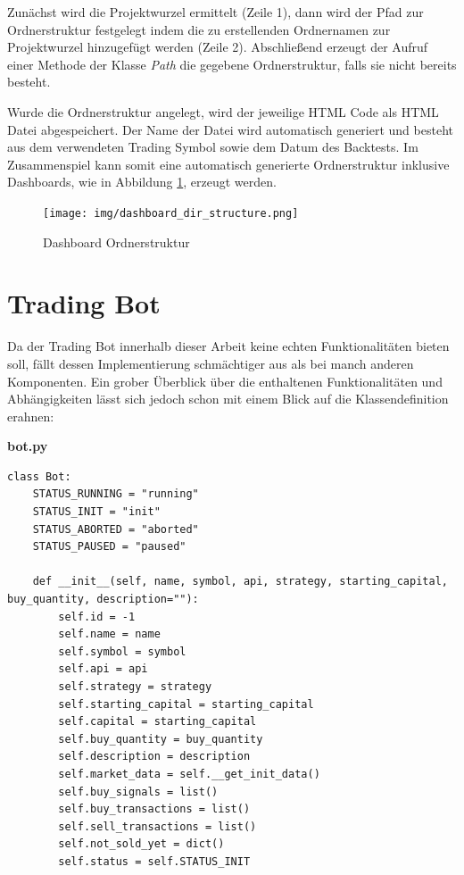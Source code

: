 \documentclass[oneside]{ausarbeitung}
\begin{document}
Zunächst wird die Projektwurzel ermittelt (Zeile 1), dann wird der Pfad zur Ordnerstruktur festgelegt indem die zu erstellenden Ordnernamen zur Projektwurzel  hinzugefügt werden (Zeile 2). Abschließend erzeugt der Aufruf einer Methode der Klasse \textit{Path} die gegebene Ordnerstruktur, falls sie nicht bereits besteht.

Wurde die Ordnerstruktur angelegt, wird der jeweilige HTML Code als HTML Datei abgespeichert. Der Name der Datei wird automatisch generiert und besteht aus dem verwendeten Trading Symbol sowie dem Datum des Backtests. Im Zusammenspiel kann somit eine automatisch generierte Ordnerstruktur inklusive Dashboards, wie in Abbildung \ref{fig:20}, erzeugt werden. 

\begin{figure}[H]
  \centering
  \texttt{[image: img/dashboard\_dir\_structure.png]}
  \caption{Dashboard Ordnerstruktur}
  \label{fig:20}
\end{figure}


\section{Trading Bot}
\label{sec:trading_bot}

Da der Trading Bot innerhalb dieser Arbeit keine echten Funktionalitäten bieten soll, fällt dessen Implementierung schmächtiger aus als bei manch anderen Komponenten. Ein grober Überblick über die enthaltenen Funktionalitäten und Abhängigkeiten lässt sich jedoch schon mit einem Blick auf die Klassendefinition erahnen:

\lstset{language=Python}
\lstset{frame=lines}
\lstset{basicstyle=\footnotesize}
\textbf{bot.py}
\begin{lstlisting}
class Bot:
    STATUS_RUNNING = "running"
    STATUS_INIT = "init"
    STATUS_ABORTED = "aborted"
    STATUS_PAUSED = "paused"

    def __init__(self, name, symbol, api, strategy, starting_capital, buy_quantity, description=""):
        self.id = -1 
        self.name = name
        self.symbol = symbol
        self.api = api
        self.strategy = strategy
        self.starting_capital = starting_capital  
        self.capital = starting_capital
        self.buy_quantity = buy_quantity
        self.description = description
        self.market_data = self.__get_init_data()  
        self.buy_signals = list()
        self.buy_transactions = list()
        self.sell_transactions = list()
        self.not_sold_yet = dict()
        self.status = self.STATUS_INIT
\end{lstlisting}
\end{document}
